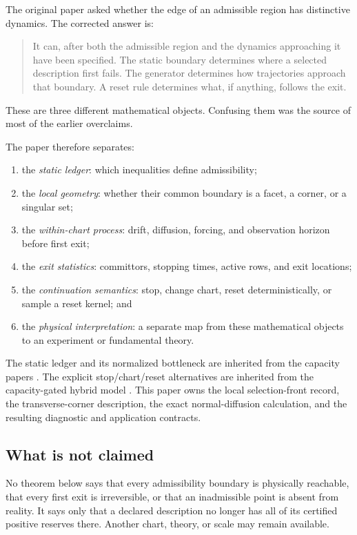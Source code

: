 \documentclass[11pt]{article}
\theoremstyle{definition}
\theoremstyle{remark}
\begin{document}
The original paper asked whether the edge of an admissible region has
distinctive dynamics.  The corrected answer is:

\begin{quote}
It can, after both the admissible region and the dynamics approaching it
have been specified.  The static boundary determines where a selected
description first fails.  The generator determines how trajectories
approach that boundary.  A reset rule determines what, if anything, follows
the exit.
\end{quote}

These are three different mathematical objects.  Confusing them was the
source of most of the earlier overclaims.

The paper therefore separates:
\begin{enumerate}[leftmargin=2em]
\item the \emph{static ledger}: which inequalities define admissibility;
\item the \emph{local geometry}: whether their common boundary is a facet,
      a corner, or a singular set;
\item the \emph{within-chart process}: drift, diffusion, forcing, and
      observation horizon before first exit;
\item the \emph{exit statistics}: committors, stopping times, active rows,
      and exit locations;
\item the \emph{continuation semantics}: stop, change chart, reset
      deterministically, or sample a reset kernel; and
\item the \emph{physical interpretation}: a separate map from these
      mathematical objects to an experiment or fundamental theory.
\end{enumerate}

The static ledger and its normalized bottleneck are inherited from the
capacity papers
\cite{CapacityMargin2026,CapacityBudget2026,CapacityDynamics2026}.
The explicit stop/chart/reset alternatives are inherited from the
capacity-gated hybrid model \cite{CapacityGated2026}.  This paper owns the
local selection-front record, the transverse-corner description, the exact
normal-diffusion calculation, and the resulting diagnostic and application
contracts.

\subsection{What is not claimed}

No theorem below says that every admissibility boundary is physically
reachable, that every first exit is irreversible, or that an inadmissible
point is absent from reality.  It says only that a declared description no
longer has all of its certified positive reserves there.  Another chart,
theory, or scale may remain available.
\end{document}
